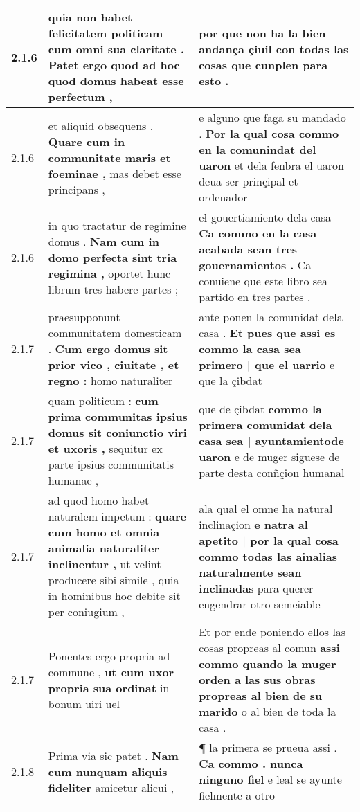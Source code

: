 \begin{tabular}{|p{1cm}|p{6.5cm}|p{6.5cm}|}
2.1.6 & quia non habet felicitatem politicam \textbf{ cum omni sua claritate . } Patet ergo quod ad hoc quod domus habeat esse perfectum , & por que non ha la bien andança \textbf{ çiuil con todas las cosas } que cunplen para esto . \\\hline
2.1.6 & et aliquid obsequens . \textbf{ Quare cum in communitate maris et foeminae , } mas debet esse principans , & e alguno que faga su mandado . \textbf{ Por la qual cosa commo en la comunindat del uaron } et dela fenbra el uaron deua ser prinçipal et ordenador \\\hline
2.1.6 & in quo tractatur de regimine domus . \textbf{ Nam cum in domo perfecta sint tria regimina , } oportet hunc librum tres habere partes ; & eł gouertiamiento dela casa \textbf{ Ca commo en la casa acabada sean tres gouernamientos . } Ca conuiene que este libro sea partido en tres partes . \\\hline
2.1.7 & praesupponunt communitatem domesticam . \textbf{ Cum ergo domus sit prior vico , ciuitate , et regno : } homo naturaliter & ante ponen la comunidat dela casa . \textbf{ Et pues que assi es commo la casa sea primero | que el uarrio } e que la çibdat \\\hline
2.1.7 & quam politicum : \textbf{ cum prima communitas ipsius domus sit coniunctio viri et uxoris , } sequitur ex parte ipsius communitatis humanae , & que de çibdat \textbf{ commo la primera comunidat dela casa sea | ayuntamientode uaron } e de muger siguese de parte desta conñçion humanal \\\hline
2.1.7 & ad quod homo habet naturalem impetum : \textbf{ quare cum homo et omnia animalia naturaliter inclinentur , } ut velint producere sibi simile , quia in hominibus hoc debite sit per coniugium , & ala qual el omne ha natural inclinaçion \textbf{ e natra al apetito | por la qual cosa commo todas las ainalias naturalmente sean inclinadas } para querer engendrar otro semeiable \\\hline
2.1.7 & Ponentes ergo propria ad commune , \textbf{ ut cum uxor propria sua ordinat } in bonum uiri uel & Et por ende poniendo ellos las cosas propreas al comun \textbf{ assi commo quando la muger orden a las sus obras propreas al bien de su marido } o al bien de toda la casa . \\\hline
2.1.8 & Prima via sic patet . \textbf{ Nam cum nunquam aliquis fideliter } amicetur alicui , & ¶ la primera se prueua assi . \textbf{ Ca commo . nunca ninguno fiel } e leal se ayunte fielmente a otro \\\hline

\end{tabular}
